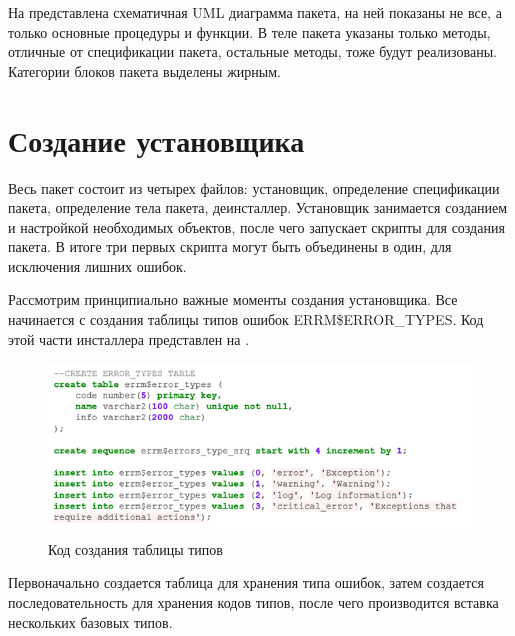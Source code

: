 На  представлена схематичная UML диаграмма пакета, на ней показаны не все, а только основные процедуры и функции. В теле пакета указаны только методы, отличные от спецификации пакета, остальные методы, тоже будут реализованы. Категории блоков пакета выделены жирным. 


\section{Создание установщика} \label{ch3:sec6}

Весь пакет состоит из четырех файлов: установщик, определение спецификации пакета, определение тела пакета, деинсталлер. Установщик занимается созданием и настройкой необходимых объектов, после чего запускает скрипты для создания пакета. В итоге три первых скрипта могут быть объединены в один, для исключения лишних ошибок. 

Рассмотрим принципиально важные моменты создания установщика. Все начинается с создания таблицы типов ошибок ERRM\$ERROR\_TYPES. Код этой части инсталлера представлен на  .

\begin{figure}[ht!] 
	\center
	\includegraphics [scale=1] {my_folder/img/C3_create_error_types_table.png}
	\caption{Код создания таблицы типов} 
	\label{fig:C3_create_error_types_table}  
\end{figure}
\FloatBarrier

Первоначально создается таблица для хранения типа ошибок, затем создается последовательность для хранения кодов типов, после чего производится вставка нескольких базовых типов. 

